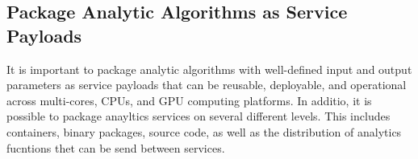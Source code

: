 
\subsection{Package Analytic Algorithms as Service Payloads}
\label{sec:package}

It is important to package analytic algorithms with well-defined
input and output parameters as service payloads that can be reusable,
deployable, and operational across multi-cores, CPUs, and GPU
computing platforms.
In additio, it is possible to package anayltics services on several 
different levels. This includes containers, binary packages, source
code, as well as the distribution of analytics fucntions thet can be
send between services. 


